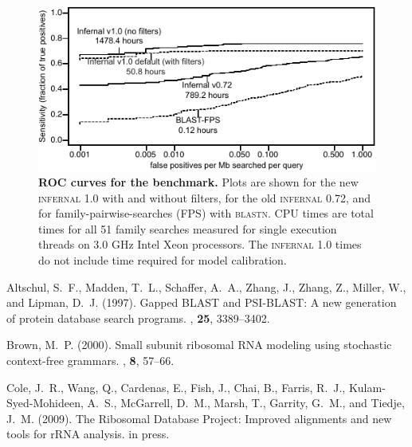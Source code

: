 \documentclass{bioinfo}
\begin{document}
\begin{application}
\begin{figure}[h]
\centerline{\includegraphics{roc-short}}
\caption{\textbf{ROC curves for the benchmark.}  Plots are shown for
the new \textsc{infernal} 1.0 with and without filters, for the old
\textsc{infernal} 0.72, and for family-pairwise-searches (FPS) with
\textsc{blastn}. CPU times are total times for all 51 family
searches measured for single execution threads on 3.0 GHz Intel Xeon
 processors. The \textsc{infernal} 1.0 times do not include time
 required for model calibration.}
\end{figure}


%
%


%

\begin{thebibliography}{}

Altschul, S.~F., Madden, T.~L., Schaffer, A.~A., Zhang, J., Zhang, Z., Miller,
  W., and Lipman, D.~J. (1997).
\newblock Gapped {BLAST} and {PSI-BLAST}: A new generation of protein database
  search programs.
, {\bf 25}, 3389--3402.

Brown, M.~P. (2000).
\newblock Small subunit ribosomal {RNA} modeling using stochastic context-free
  grammars.
, {\bf 8}, 57--66.

Cole, J.~R., Wang, Q., Cardenas, E., Fish, J., Chai, B., Farris, R.~J.,
  Kulam-Syed-Mohideen, A.~S., McGarrell, D.~M., Marsh, T., Garrity, G.~M., and
  Tiedje, J.~M. (2009).
\newblock The {R}ibosomal {D}atabase {P}roject: Improved alignments and new
  tools for {rRNA} analysis.
\newblock in press.


\end{thebibliography}
\end{application}
\end{document}
